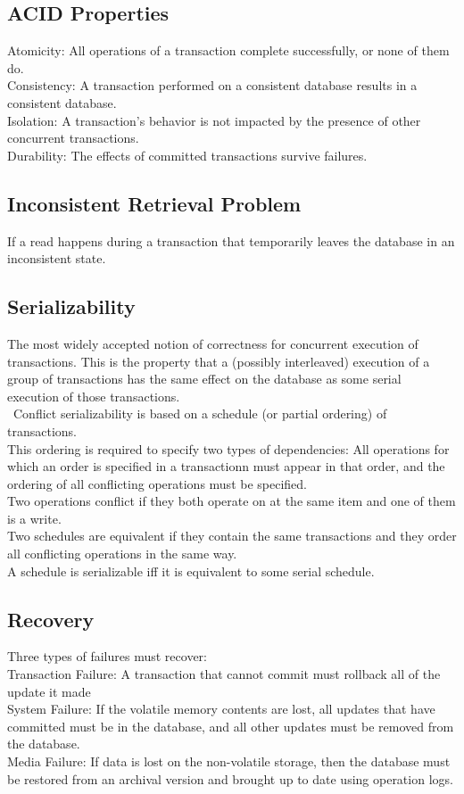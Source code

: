 \subsection{ACID Properties}
Atomicity: All operations of a transaction complete successfully, or none of them do.\\
Consistency: A transaction performed on a consistent database results in a consistent database.\\
Isolation: A transaction's behavior is not impacted by the presence of other concurrent transactions.\\
Durability: The effects of committed transactions survive failures.
\subsection{Inconsistent Retrieval Problem}
If a read happens during a transaction that temporarily leaves the database in an inconsistent state.
\subsection{Serializability}
The most widely accepted notion of correctness for concurrent execution of transactions.
This is the property that a (possibly interleaved) execution of a group of transactions has the same effect on the database as some serial execution of those transactions. \\\
Conflict serializability is based on a schedule (or partial ordering) of transactions. \\
This ordering is required to specify two types of dependencies: All operations for which an order is specified in a transactionn must appear in that order, and the ordering of all conflicting operations must be specified. \\
Two operations conflict if they both operate on at the same item and one of them is a write.\\
Two schedules are equivalent if they contain the same transactions and they order all conflicting operations in the same way.\\
A schedule is serializable iff it is equivalent to some serial schedule.\\
\subsection{Recovery}
Three types of failures must recover:\\
Transaction Failure: A transaction that cannot commit must rollback all of the update it made\\
System Failure: If the volatile memory contents are lost, all updates that have committed must be in the database, and all other updates must be removed from the database.\\
Media Failure: If data is lost on the non-volatile storage, then the database must be restored from an archival version and brought up to date using operation logs.\\
